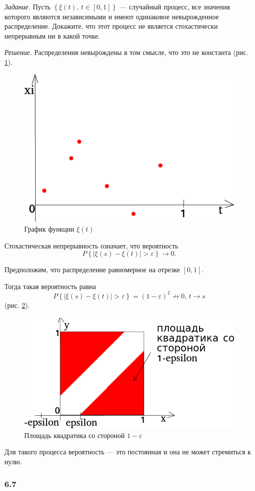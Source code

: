 \textit{Задание.}
Пусть $ \left\{ \xi \left( t \right), \, t \in \left[ 0, 1 \right] \right\} $ ---
случайный процесс, все значения которого являются независимыми и имеют одинаковое невырожденное
распределение.
Докажите, что этот процесс не является стохастически непрерывным ни в какой точке.

\textit{Решение.}
Распределения невырождены в том смысле, что это не константа (рис. \ref{fig:64}).

\begin{figure}[h!]
  \centering
  \includegraphics[width=.4\textwidth]{./pictures/6_4.png}
  \caption{График функции $ \xi \left( t \right) $}
  \label{fig:64}
\end{figure}

Стохастическая непрерывность означает, что вероятность
$$P \left\{ \left| \xi \left( s \right) - \xi \left( t \right) \right| > \varepsilon \right\} \to
  0.$$

Предположим, что распределение равномерное на отрезке $ \left[ 0, 1 \right] $.

Тогда такая вероятность равна
$$P \left\{ \left| \xi \left( s \right) - \xi \left( t \right) \right| > \varepsilon \right\} =
  \left( 1 - \varepsilon \right)^2 \not \to
  0, \,
  t \to s$$
(рис. \ref{fig:641}).

\begin{figure}[h!]
  \centering
  \includegraphics[width=.4\textwidth]{./pictures/6_4_1.png}
  \caption{Площадь квадратика со стороной $1 - \varepsilon$}
  \label{fig:641}
\end{figure}

Для такого процесса вероятность --- это постоянная и она не может стремиться к нулю.

\subsubsection*{6.7}

